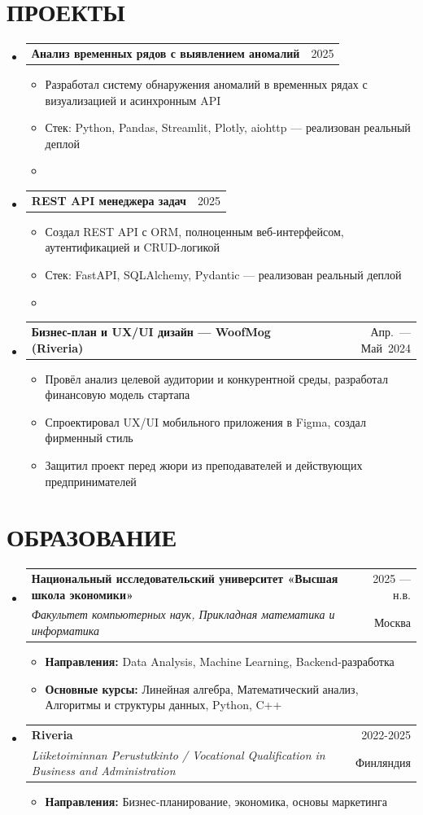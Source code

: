 \documentclass[letterpaper,11pt]{article}
\makeatletter
\newcommand{\myuline}[1]{%
  \uline{\phantom{#1}}%
  \llap{\contour{white}{#1}}%
}
\newcommand{\resumeItem}[1]{
  \item\small{
    {#1 \vspace{-1pt}}
  }
}
\newcommand{\resumeSubheading}[4]{
  \vspace{-1pt}\item
    \begin{tabular*}{\textwidth}[t]{l@{\extracolsep{\fill}}r}
      \textbf{#1} & {\color{dark-grey}\small #2}\vspace{1pt}\\
      \textit{#3} & {\color{dark-grey} \small #4}\\
    \end{tabular*}\vspace{-4pt}
}
\newcommand{\resumeProjectHeading}[2]{
    \item
    \begin{tabular*}{\textwidth}{l@{\extracolsep{\fill}}r}
      #1 & {\color{dark-grey}\small #2} \\
    \end{tabular*}\vspace{-4pt}
}
\newcommand{\resumeSubHeadingListStart}{\begin{itemize}[leftmargin=0in, label={}]}
\newcommand{\resumeSubHeadingListEnd}{\end{itemize}}
\newcommand{\resumeItemListStart}{\begin{itemize}}
\newcommand{\resumeItemListEnd}{\end{itemize}\vspace{0pt}}
\makeatother
\begin{document}
\section{ПРОЕКТЫ}
    \resumeSubHeadingListStart
      \resumeProjectHeading
          {\textbf{Анализ временных рядов с выявлением аномалий}}{2025}
          \resumeItemListStart
            \resumeItem{Разработал систему обнаружения аномалий в временных рядах с визуализацией и асинхронным API}
            \resumeItem{Стек: Python, Pandas, Streamlit, Plotly, aiohttp --- реализован реальный деплой}
            \resumeItem{\href{https://github.com/odnorodnyy/hw_temperature_analysis}{\myuline {GitHub}}}
          \resumeItemListEnd
      \resumeProjectHeading
          {\textbf{REST API менеджера задач}}{2025}
          \resumeItemListStart
            \resumeItem{Создал REST API с ORM, полноценным веб-интерфейсом, аутентификацией и CRUD-логикой}
            \resumeItem{Стек: FastAPI, SQLAlchemy, Pydantic --- реализован реальный деплой}
            \resumeItem{\href{https://github.com/odnorodnyy/hw_fastapi}{\myuline {GitHub}}}       
          \resumeItemListEnd
      \resumeProjectHeading
          {\textbf{Бизнес-план и UX/UI дизайн --- WoofMog (Riveria)}}{Апр.~--- Май~2024}
          \resumeItemListStart
            \resumeItem{Провёл анализ целевой аудитории и конкурентной среды, разработал финансовую модель стартапа}
            \resumeItem{Спроектировал UX/UI мобильного приложения в Figma, создал фирменный стиль}
            \resumeItem{Защитил проект перед жюри из преподавателей и действующих предпринимателей}
          \resumeItemListEnd
    \resumeSubHeadingListEnd

\section{ОБРАЗОВАНИЕ}
  \resumeSubHeadingListStart
    \resumeSubheading
      {Национальный исследовательский университет «Высшая школа экономики»}{2025 --- н.в.}
      {Факультет компьютерных наук, Прикладная математика и информатика}{Москва}
      \resumeItemListStart
        \resumeItem{\textbf{Направления:} Data Analysis, Machine Learning, Backend-разработка}
        \resumeItem{\textbf{Основные курсы:} Линейная алгебра, Математический анализ, Алгоритмы и структуры данных, Python, C++}
      \resumeItemListEnd
    \resumeSubheading
      {Riveria}{2022-2025}
      {Liiketoiminnan Perustutkinto / Vocational Qualification in Business and Administration}{Финляндия}
      \resumeItemListStart
        \resumeItem{\textbf{Направления:} Бизнес-планирование, экономика, основы маркетинга}
      \resumeItemListEnd
  \resumeSubHeadingListEnd
\end{document}
